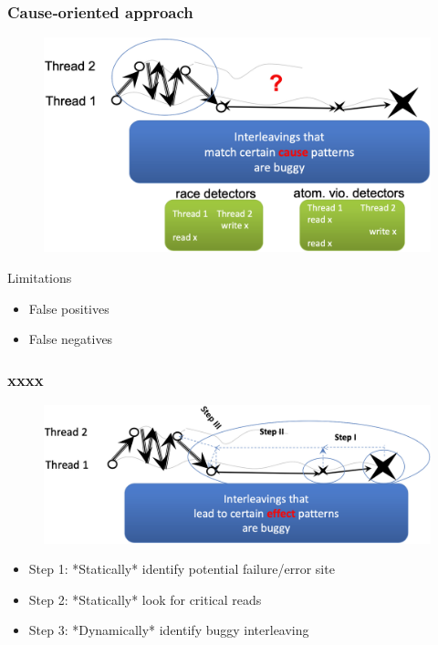 % 
% 
\begin{frame}[fragile]
    \frametitle{Cause‐oriented approach}
    \begin{figure}
    \includegraphics[width=0.4\linewidth]{figs/cause-oriented-approach.png}
    \end{figure}
	\begin{block}{Limitations}

        \begin{itemize}
            \item False positives
            \item False negatives
        \end{itemize}
    \end{block}
\end{frame}
% 
% 
% 
% 
\begin{frame}[fragile]
    \frametitle{xxxx}
    \begin{figure}
    \includegraphics[width=0.4\linewidth]{figs/Effect‐oriented-approach.png}
    \end{figure}

    \begin{itemize}
        \item Step 1: *Statically* identify potential failure/error site
        \item Step 2: *Statically* look for critical reads
        \item Step 3: *Dynamically* identify buggy interleaving
    \end{itemize}

\end{frame}
